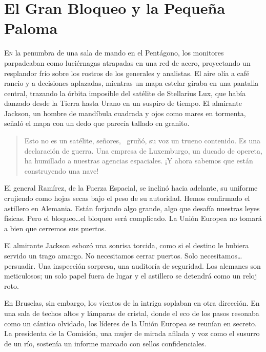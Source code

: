 

\chapter{El Gran Bloqueo y la Pequeña Paloma}

\lettrine[lines=2, loversize=0.3, lraise=0]{E}{n} la penumbra de una sala de mando en el Pentágono, los monitores parpadeaban como luciérnagas atrapadas en una red de acero, proyectando un resplandor frío sobre los rostros de los generales y analistas. El aire olía a café rancio y a decisiones aplazadas, mientras un mapa estelar giraba en una pantalla central, trazando la órbita imposible del satélite de Stellarius Lux, que había danzado desde la Tierra hasta Urano en un suspiro de tiempo. El almirante Jackson, un hombre de mandíbula cuadrada y ojos como mares en tormenta, señaló el mapa con un dedo que parecía tallado en granito.

\begin{quote}
\calli
\glqq Esto no es un satélite, señores,\grqq~ gruñó, su voz un trueno contenido. \glqq Es una declaración de guerra. Una empresa de Luxemburgo, un ducado de opereta, ha humillado a nuestras agencias espaciales. ¡Y ahora sabemos que están construyendo una nave!\grqq
\end{quote}

El general Ramírez, de la Fuerza Espacial, se inclinó hacia adelante, su uniforme crujiendo como hojas secas bajo el peso de su autoridad. \glqq Hemos confirmado el astillero en Alemania. Están forjando algo grande, algo que desafía nuestras leyes físicas. Pero el bloqueo\ldots el bloqueo será complicado. La Unión Europea no tomará a bien que cerremos sus puertos.\grqq

El almirante Jackson esbozó una sonrisa torcida, como si el destino le hubiera servido un trago amargo. \glqq No necesitamos cerrar puertos. Solo necesitamos\ldots persuadir. Una inspección sorpresa, una auditoría de seguridad. Los alemanes son meticulosos; un solo papel fuera de lugar y el astillero se detendrá como un reloj roto.\grqq

En Bruselas, sin embargo, los vientos de la intriga soplaban en otra dirección. En una sala de techos altos y lámparas de cristal, donde el eco de los pasos resonaba como un cántico olvidado, los líderes de la Unión Europea se reunían en secreto. La presidenta de la Comisión, una mujer de mirada afilada y voz como el susurro de un río, sostenía un informe marcado con sellos confidenciales.

